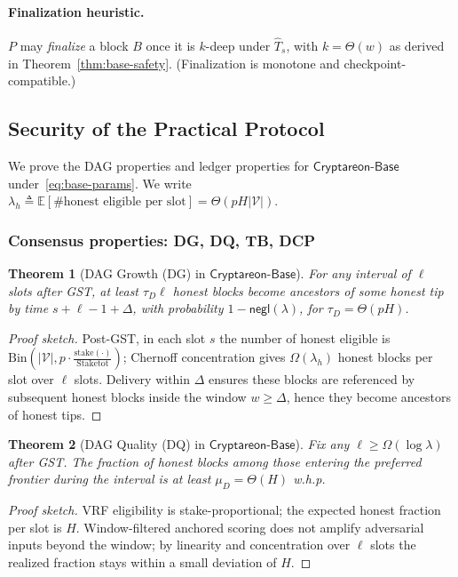 \documentclass[11pt]{article}
\newtheorem{theorem}{Theorem}[section]
\newcommand{\ProjBase}{\ensuremath{\mathsf{Cryptareon\text{-}Base}}\xspace}
\newcommand{\negl}{\ensuremath{\mathsf{negl}}\xspace}
\newcommand{\Val}{\ensuremath{\mathcal{V}}\xspace}
\newcommand{\stake}{\ensuremath{\mathrm{stake}}\xspace}
\newcommand{\StakeTot}{\ensuremath{\mathrm{Stake}{\mathrm{tot}}}\xspace}
\newcommand{\stakefrac}[1]{\ensuremath{\frac{\stake(#1)}{\StakeTot}}\xspace}
\begin{document}




\paragraph{Finalization heuristic.}
$P$ may \emph{finalize} a block $B$ once it is $k$-deep under $\hat T_s$, with $k=\Theta(w)$ as derived in Theorem~\ref{thm:base-safety}. (Finalization is monotone and checkpoint-compatible.)

\subsection{Security of the Practical Protocol}
\label{subsec:base-security}
We prove the DAG properties and ledger properties for \ProjBase under~\eqref{eq:base-params}. We write $\lambda_h \triangleq \mathbb{E}[\#\text{honest eligible per slot}]=\Theta(pH|\Val|)$.

\subsubsection{Consensus properties: DG, DQ, TB, DCP}
\begin{theorem}[DAG Growth (DG) in \ProjBase]
\label{thm:base-DG}
For any interval of $\ell$ slots after GST, at least $\tau_D\ell$ honest blocks become ancestors of some honest tip by time $s{+}\ell{-}1{+}\Delta$, with probability $1-\negl(\lambda)$, for $\tau_D=\Theta(pH)$.
\end{theorem}
\begin{proof}[Proof sketch]
Post-GST, in each slot $s$ the number of honest eligible is $\mathrm{Bin}(|\Val|,p\cdot \stakefrac{\cdot})$; Chernoff concentration gives $\Omega(\lambda_h)$ honest blocks per slot over $\ell$ slots. Delivery within $\Delta$ ensures these blocks are referenced by subsequent honest blocks inside the window $w\ge \Delta$, hence they become ancestors of honest tips.
\end{proof}

\begin{theorem}[DAG Quality (DQ) in \ProjBase]
\label{thm:base-DQ}
Fix any $\ell\ge \Omega(\log\lambda)$ after GST. The fraction of honest blocks among those entering the preferred frontier during the interval is at least $\mu_D=\Theta(H)$ w.h.p.
\end{theorem}
\begin{proof}[Proof sketch]
VRF eligibility is stake-proportional; the expected honest fraction per slot is $H$. Window-filtered anchored scoring does not amplify adversarial inputs beyond the window; by linearity and concentration over $\ell$ slots the realized fraction stays within a small deviation of $H$.
\end{proof}
\end{document}

